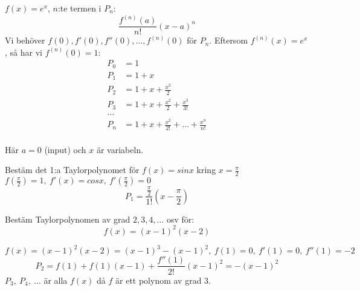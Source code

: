 \documentclass{report}
\begin{document}
{
$ f(x) = e^x $, $ n $:te termen i $ P_n $:
\begin{equation*}
	\frac{f^{(n)}(a)}{n!} (x-a)^n
\end{equation*}
Vi behöver $ f(0), f'(0), f''(0), \ldots , f^{(n)}(0) $ för $ P_n $. Eftersom $ f^{(n)}(x) = e^x $, så har vi $ f^{(n)}(0) = 1 $:
\begin{align*}
	P_0 &= 1\\
	P_1 &= 1+x\\
	P_2 &= 1+x+ \frac{x^2}{2} \\
	P_3 &= 1+x+ \frac{x^2}{2} + \frac{x^3}{3!}\\
	\ldots \\
	P_n &= 1 + x + \frac{x^2}{2!} + \ldots + \frac{x^n}{n!} 
\end{align*}
\dotfill\\
Här $ a = 0 $ (input) och $ x $ är variabeln.

\begin{center}
\end{center}
}

\qs{}
{
	Bestäm det 1:a Taylorpolynomet för $ f(x) = sinx $ kring $ x = \frac{\pi}{2}  $
}
\sol $ f( \frac{\pi}{2} ) = 1,\: f'(x) = cosx,\: f'( \frac{\pi}{2} ) = 0 $ 
\begin{equation*}
P_1 = \frac{ \frac{\pi}{2} }{1!} (x- \frac{\pi}{2} )
\end{equation*}

\vspace{20pt}
\qs{}
{
Bestäm Taylorpolynomen av grad $ 2,3,4, \ldots  $ osv för:
\begin{equation*}
f(x) = (x-1)^2(x-2)
\end{equation*}
}

\sol $ f(x) = (x-1)^2(x-2) = (x-1)^3-(x-1)^2,\: f(1) = 0,\: f'(1) = 0,\: f''(1) = -2 $
\begin{equation*}
P_2 = f(1) + f(1)(x-1) + \frac{f''(1)}{2!} (x-1)^2 = -(x-1)^2
\end{equation*}
$ P_3,\: P_4, \: \ldots  $ är alla $ f(x) $ då $ f $ är ett polynom av grad 3. 
\end{document}
